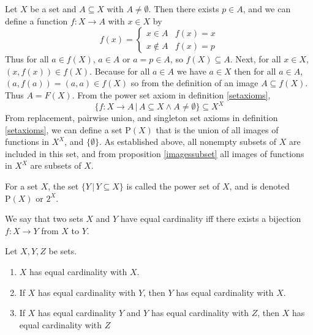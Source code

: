 \documentclass{article}
\begin{document}
\begin{IEEEproof}
	Let \(X\) be a set and \(A\subseteq X\) with \(A\neq\emptyset\). Then there exists \(p\in A\), and we can define a function \(f:X\rightarrow A\) with \(x\in X\) by
	\begin{equation*}
		f(x)=\begin{cases}
			x\in A&f(x)=x\\
			x\notin A&f(x)=p
		\end{cases}
	\end{equation*}
	Thus for all \(a\in f(X)\), \(a\in A\) or \(a=p\in A\), so \(f(X)\subseteq A\). Next, for all \(x\in X\), \((x,f(x))\in f(X)\). Because for all \(a\in A\) we have \(a\in X\) then for all \(a\in A\), \((a,f(a))=(a,a)\in f(X)\) so from the definition of an image \(A\subseteq f(X)\). Thus \(A=F(X)\). From the power set axiom in definition \ref{setaxioms}, 
	\begin{equation*}
		\{f:X\rightarrow A\,|\,A\subseteq X\wedge A\neq\emptyset\}\subseteq X^X
	\end{equation*}
	From replacement, pairwise union, and singleton set axioms in definition \ref{setaxioms}, we can define a set \(\text{P}(X)\) that is the union of all images of functions in \(X^X\), and \(\{\emptyset\}\). As established above, all nonempty subsets of \(X\) are included in this set, and from proposition \ref{imagessubset} all images of functions in \(X^X\) are subsets of \(X\).
\end{IEEEproof}
\begin{definition}
	For a set \(X\), the set \(\{Y\,|\,Y\subseteq X\}\) is called the power set of \(X\), and is denoted \(\text{P}(X)\) or \(2^X\).
\end{definition}
\begin{definition}[Cardinality]
	We say that two sets \(X\) and \(Y\) have equal cardinality iff there exists a bijection \(f:X\rightarrow Y\) from \(X\) to \(Y\).
\end{definition}
\begin{proposition}
	Let \(X,Y,Z\) be sets.
	\begin{enumerate}
		\item \(X\) has equal cardinality with \(X\).
		\item If \(X\) has equal cardinality with \(Y\), then \(Y\) has equal cardinality with \(X\).
		\item If \(X\) has equal cardinality \(Y\) and \(Y\) has equal cardinality with \(Z\), then \(X\) has equal cardinality with \(Z\)
			\begin{IEEEproof}
			\end{IEEEproof}
	\end{enumerate}
\end{proposition}
\end{document}
